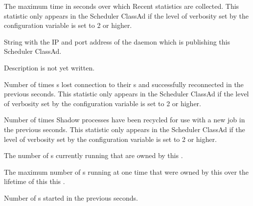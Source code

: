 \begin{description}
\item[\AdAttr{RecentWindowMax}:] The maximum time in seconds over which Recent statistics are collected.
  This statistic only appears in the Scheduler ClassAd if the level of
  verbosity set by the configuration variable 
  is set to 2 or higher.

\item[\AdAttr{ScheddIpAddr}:] String with the IP and port address of the
 daemon which is publishing this Scheduler ClassAd.

\item[\AdAttr{ServerTime}:] Description is not yet written.

\item[\AdAttr{ShadowsReconnections}:] Number of times s lost 
  connection to their s and successfully reconnected
  in the previous  seconds.
  This statistic only appears in the Scheduler ClassAd if the level of
  verbosity set by the configuration variable 
  is set to 2 or higher.

\item[\AdAttr{ShadowsRecycled}:] Number of times Shadow processes have been 
  recycled for use with a new job
  in the previous  seconds.
  This statistic only appears in the Scheduler ClassAd if the level of
  verbosity set by the configuration variable 
  is set to 2 or higher.

\item[\AdAttr{ShadowsRunning}:] The number of s currently running 
  that are owned by this .

\item[\AdAttr{ShadowsRunningPeak}:] The maximum number of s running at one time
  that were owned by this  over the lifetime of this this .

\item[\AdAttr{ShadowsStarted}:] Number of s started
  in the previous  seconds.


\end{description}
